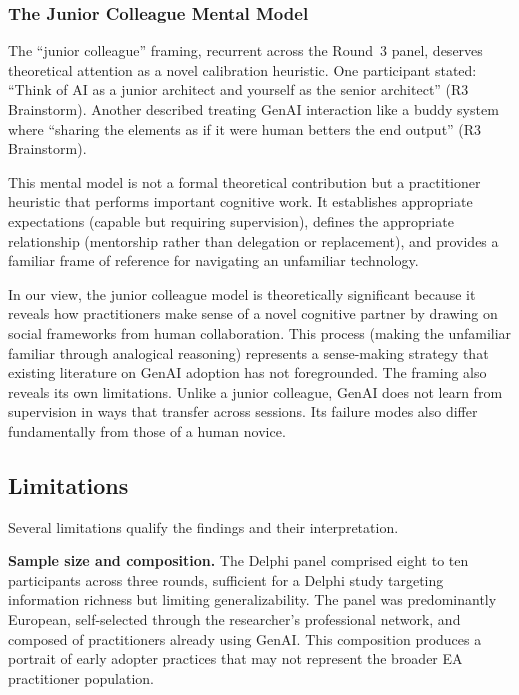 \subsubsection{The Junior Colleague Mental Model}

The ``junior colleague'' framing, recurrent across the Round~3 panel, deserves
theoretical attention as a novel calibration heuristic. One participant
stated: ``Think of AI as a junior architect and yourself as the senior
architect'' (R3 Brainstorm). Another described treating GenAI interaction like
a buddy system where ``sharing the elements as if it were human betters the
end output'' (R3 Brainstorm).

This mental model is not a formal theoretical contribution but a practitioner
heuristic that performs important cognitive work. It establishes appropriate
expectations (capable but requiring supervision), defines the appropriate
relationship (mentorship rather than delegation or replacement), and provides
a familiar frame of reference for navigating an unfamiliar technology.

In our view, the junior colleague model is theoretically significant because
it reveals how practitioners make sense of a novel cognitive partner by drawing
on social frameworks from human collaboration. This process (making the
unfamiliar familiar through analogical reasoning) represents a sense-making
strategy that existing literature on GenAI adoption has not foregrounded. The
framing also reveals its own limitations. Unlike a junior colleague, GenAI
does not learn from supervision in ways that transfer across sessions. Its
failure modes also differ fundamentally from those of a human novice.

\subsection{Limitations}\label{subsec:disc-limitations}

Several limitations qualify the findings and their interpretation.

\textbf{Sample size and composition.} The Delphi panel comprised eight to ten
participants across three rounds, sufficient for a Delphi study targeting information richness but limiting
generalizability. The panel was
predominantly European, self-selected through the researcher's professional
network, and composed of practitioners already using GenAI. This composition
produces a portrait of early adopter practices that may not represent the
broader EA practitioner population.

